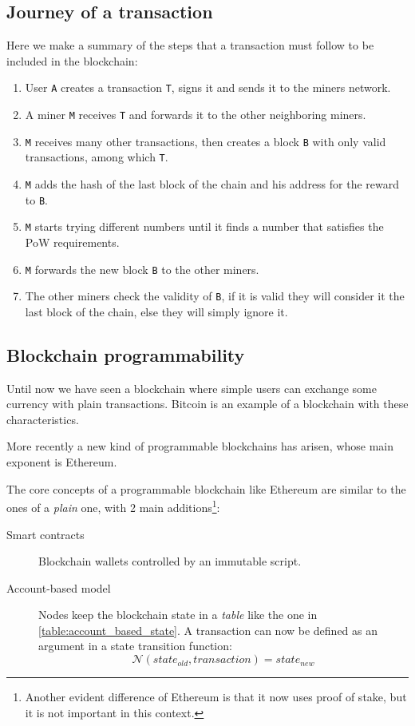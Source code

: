 \documentclass[12pt]{article}
\begin{document}
\subsection{Journey of a transaction} \label{subsection:joat}
Here we make a summary of the steps that a transaction must follow to be included in the blockchain:
\begin{enumerate}
    \item User \verb|A| creates a transaction \verb|T|, signs it and sends it to the miners network.
    \item A miner \verb|M| receives \verb|T| and forwards it to the other neighboring miners.
    \item \verb|M| receives many other transactions, then creates a block \verb|B| with only valid transactions, among which \verb|T|.
    \item \verb|M| adds the hash of the last block of the chain and his address for the reward to \verb|B|.
    \item \verb|M| starts trying different numbers until it finds a number that satisfies the PoW requirements.
    \item \verb|M| forwards the new block \verb|B| to the other miners. 
    \item The other miners check the validity of \verb|B|, if it is valid they will consider it the last block of the chain, else they will simply ignore it.
\end{enumerate}

\subsection{Blockchain programmability} \label{subsection:programmability}
Until now we have seen a blockchain where simple users can exchange some currency with plain transactions. Bitcoin is an example of a blockchain with these characteristics.

More recently a new kind of programmable blockchains has arisen, whose main exponent is Ethereum. 

The core concepts of a programmable blockchain like Ethereum are similar to the ones of a \textit{plain} one, with 2 main additions\footnote{Another evident difference of Ethereum is that it now uses proof of stake, but it is not important in this context.}:
\begin{description}
    \item[Smart contracts] Blockchain wallets controlled by an immutable script.
    \item[Account-based model] Nodes keep the blockchain state in a \textit{table} like the one in \ref{table:account_based_state}. A transaction can now be defined as an argument in a state transition function: 
    \[\mathcal{N} (state_{old}, transaction) = state_{new}\]
\end{description}
\end{document}
